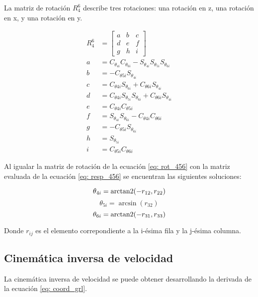 La matriz de rotación $R_4^6$ describe tres rotaciones: 
una rotación en z, una rotación en x, y una rotación en y.

\begin{subequations}
    \begin{align}
R_4^6 &= \begin{bmatrix}
         a & b & c\\
         d & e & f\\
         g & h & i
        \end{bmatrix}\label{eq: rot_456}\\
a &= C_{\theta_{4i}} C_{\theta_{6i}} - S_{\theta_{4i}} S_{\theta_{5i}} S_{\theta_{6i}}\\
b &= -C_{\theta{5i}} S_{\theta_{4i}}\\
c &= C_{\theta{4i}} S_{\theta_{6i}} + C_{\theta{6i}} S_{\theta_{4i}}\\
d &= C_{\theta{4i}} S_{\theta_{5i}} S_{\theta_{6i}} +C_{\theta{6i}} S_{\theta_{4i}} \\
e &= C_{\theta{4i}} C_{\theta{5i}}\\
f &= S_{\theta_{4i}} S_{\theta_{6i}} -C_{\theta{4i}} C_{\theta{6i}}\\
g &= -C_{\theta{5i}} S_{\theta_{6i}}\\
h &= S_{\theta_{5i}}\\ 
i &= C_{\theta{5i}} C_{\theta{6i}}
    \end{align}
\end{subequations}

Al igualar la matriz de rotación de la 
ecuación \eqref{eq: rot_456} con la matriz 
evaluada de la ecuación \eqref{eq: resp_456} 
se encuentran las siguientes soluciones:

\begin{equation}
\theta_{4i} = \operatorname{arctan2} (-r_{12},r_{22})
\end{equation}
\begin{equation}
\theta_{5i} = \arcsin (r_{32})
\end{equation}
\begin{equation}
\theta_{6i} = \operatorname{arctan2} (-r_{31},r_{33})
\end{equation}

Donde $r_{ij}$ es el elemento correpondiente
a la i-ésima fila y la j-ésima columna.

\subsection{Cinemática inversa de velocidad}
La cinemática inversa de velocidad se puede 
obtener desarrollando la derivada de 
la ecuación \eqref{eq: coord_grl}.

